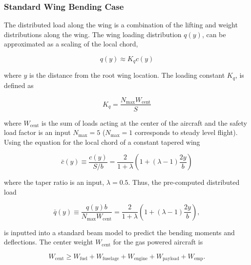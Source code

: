 
\subsubsection{Standard Wing Bending Case}
The distributed load along the wing is a combination of the lifting and weight distributions along the wing.
The wing loading distribution $q(y)$, can be approximated as a scaling of the local chord,\cite{bending}

\begin{equation}
    \label{e:wingloading}
    q(y) \approx K_q c(y) 
\end{equation}

where $y$ is the distance from the root wing location. The loading constant $K_q$\cite{bending}, is defined as

\begin{equation}
    \label{e:kq}
    K_q = \frac{N_{\text{max}}W_{\text{cent}}}{S}
\end{equation}

where $W_{\text{cent}}$ is the sum of loads acting at the center of the aircraft and the safety load factor is an input $N_{\text{max}}=5$ ($N_{\text{max}}=1$ corresponds to steady level flight). Using the equation for the local chord of a constant tapered wing\cite{bending} 

\begin{equation}
    \label{e:localchord}
    \bar{c}(y) \equiv \frac{c(y)}{S/b} = \frac{2}{1+\lambda} \left( 1 + (\lambda - 1) \frac{2y}{b} \right)
\end{equation}

where the taper ratio is an input, $\lambda=0.5$.  Thus, the pre-computed distributed load 

\begin{equation}
    \label{e:qbar}
    \bar{q}(y) \equiv \frac{q(y)b}{N_{\text{max}}W_{\text{cent}}} = \frac{2}{1+\lambda} \left( 1 + (\lambda - 1) \frac{2y}{b} \right),
\end{equation}

is inputted into a standard beam model to predict the bending moments and deflections. The center weight $W_{\text{cent}}$ for the gas powered aircraft is

\begin{equation}
    W_{\text{cent}} \geq W_{\text{fuel}} + W_{\text{fuselage}} + W_{\text{engine}} + W_{\text{payload}} + W_{\text{emp}}.
\end{equation}

